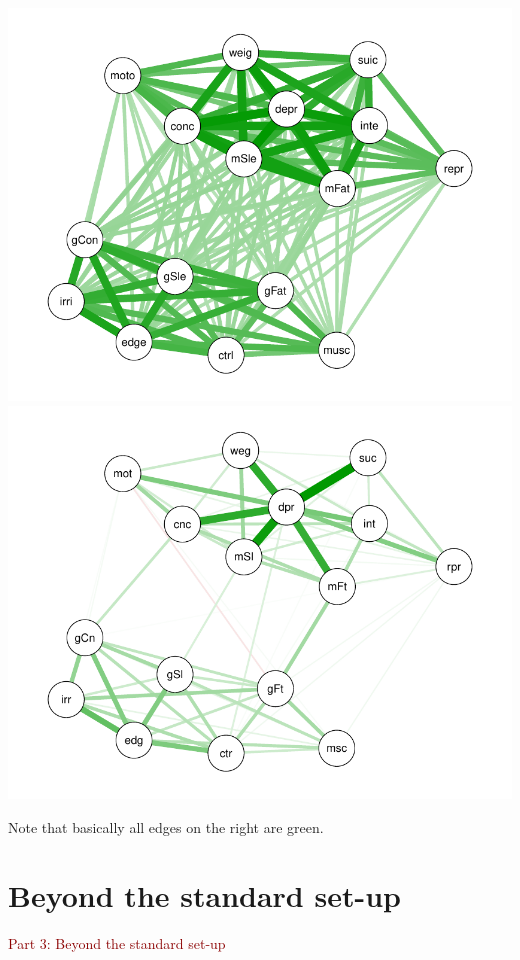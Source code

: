 \documentclass[11pt,handout,aspectratio=169,dvipsnames]{beamer}
\begin{document}
\begin{frame}[label=depr_lasso]{}
	\begin{center}
		\includegraphics[scale=.5]{pics/depr_corr}\includegraphics[scale=.5]{pics/depr_lasso}
	\end{center}
	Note that basically all edges on the right are green.
\end{frame}


\section{Beyond the standard set-up}

\begin{frame}{}
\begin{center}
	{\Huge \textcolor{DarkRed}{Part 3: Beyond the standard set-up}}
\end{center}
\end{frame}
\end{document}
